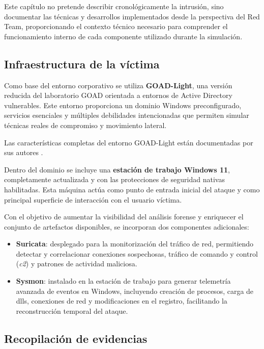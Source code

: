 Este capítulo no pretende describir cronológicamente la intrusión, sino documentar las técnicas y desarrollos implementados desde la perspectiva del Red Team, proporcionando el contexto técnico necesario para comprender el funcionamiento interno de cada componente utilizado durante la simulación.

\subsection*{Infraestructura de la víctima}

Como base del entorno corporativo se utiliza \textbf{GOAD-Light}, una versión reducida del laboratorio GOAD orientada a entornos de Active Directory vulnerables. Este entorno proporciona un dominio Windows preconfigurado, servicios esenciales y múltiples debilidades intencionadas que permiten simular técnicas reales de compromiso y movimiento lateral.

Las características completas del entorno GOAD-Light están documentadas por sus autores \cite{goad-light}.

Dentro del dominio se incluye una \textbf{estación de trabajo Windows 11}, completamente actualizada y con las protecciones de seguridad nativas habilitadas. Esta máquina actúa como punto de entrada inicial del ataque y como principal superficie de interacción con el usuario víctima.

Con el objetivo de aumentar la visibilidad del análisis forense y enriquecer el conjunto de artefactos disponibles, se incorporan dos componentes adicionales:

\begin{itemize}
    \item \textbf{Suricata}: desplegado para la monitorización del tráfico de red, permitiendo detectar y correlacionar conexiones sospechosas, tráfico de comando y control (\textit{\acrshort{c2}}) y patrones de actividad maliciosa.
    
    \item \textbf{Sysmon}: instalado en la estación de trabajo para generar telemetría avanzada de eventos en Windows, incluyendo creación de procesos, carga de \acrshort{dll}s, conexiones de red y modificaciones en el registro, facilitando la reconstrucción temporal del ataque.
\end{itemize}

\subsection{Recopilación de evidencias}

